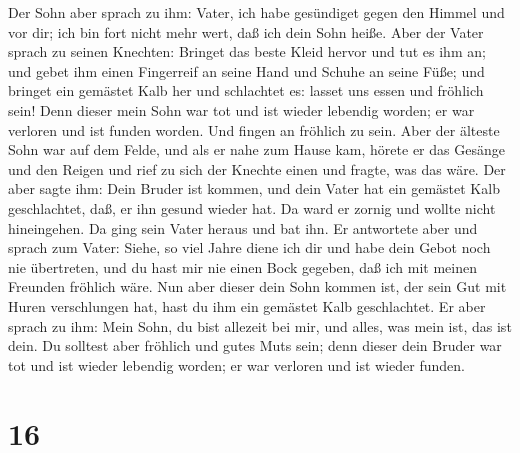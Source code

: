  Der Sohn aber sprach zu ihm: Vater, ich habe gesündiget
gegen den Himmel und vor dir; ich bin fort nicht mehr wert, daß ich dein
Sohn heiße.  Aber der Vater sprach zu seinen Knechten:
Bringet das beste Kleid hervor und tut es ihm an; und gebet ihm einen
Fingerreif an seine Hand und Schuhe an seine Füße;  und
bringet ein gemästet Kalb her und schlachtet es: lasset uns essen und
fröhlich sein!  Denn dieser mein Sohn war tot und ist
wieder lebendig worden; er war verloren und ist funden worden. Und
fingen an fröhlich zu sein.  Aber der älteste Sohn war auf
dem Felde, und als er nahe zum Hause kam, hörete er das Gesänge und den
Reigen  und rief zu sich der Knechte einen und fragte, was
das wäre.  Der aber sagte ihm: Dein Bruder ist kommen, und
dein Vater hat ein gemästet Kalb geschlachtet, daß, er ihn gesund wieder
hat.  Da ward er zornig und wollte nicht hineingehen. Da
ging sein Vater heraus und bat ihn.  Er antwortete aber und
sprach zum Vater: Siehe, so viel Jahre diene ich dir und habe dein Gebot
noch nie übertreten, und du hast mir nie einen Bock gegeben, daß ich mit
meinen Freunden fröhlich wäre.  Nun aber dieser dein Sohn
kommen ist, der sein Gut mit Huren verschlungen hat, hast du ihm ein
gemästet Kalb geschlachtet.  Er aber sprach zu ihm: Mein
Sohn, du bist allezeit bei mir, und alles, was mein ist, das ist dein.
 Du solltest aber fröhlich und gutes Muts sein; denn dieser
dein Bruder war tot und ist wieder lebendig worden; er war verloren und
ist wieder funden.

\hypertarget{section-15}{%
\section{16}\label{section-15}}

